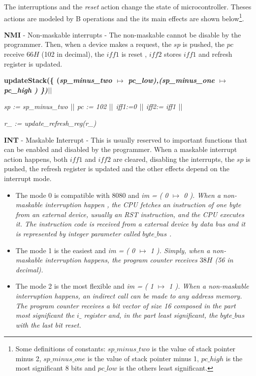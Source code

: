 \documentclass[11pt]{article} %
\begin{document}
The interruptions and the \textit{reset} action change the state of
microcontroller. Theses actions are modeled by B operations and the its main
effects are shown below\footnote{Some definitions of constants: $\mathit{sp\_minus\_two}$ is the value of stack pointer minus 2,
 $\mathit{sp\_minus\_one}$ is the value of stack pointer minus 1,
$\mathit{pc\_high}$ is the most significant 8 bits and
$\mathit{pc\_low}$ is the others least significant.}.


 \textbf{NMI} - Non-maskable interrupts - The non-maskable cannot be disable
 by the programmer. Then, when a device makes a request, the $sp$ is pushed, the $pc$ receive
 $66H$ (102 in decimal), the $\mathit{iff1}$ is reset , $\mathit{iff2}$ stores
 $\mathit{iff1}$ and refresh register is updated.
  
\begin{sloppypar}
\bf updateStack\rm (\rm \{ \rm (\it sp\_minus\_two  $\mapsto$  \it pc\_low\rm )\rm ,\rm (\it sp\_minus\_one  $\mapsto$ \it pc\_high \rm ) \rm \}\rm )$\mbox{$\mid\mid$}$

\it sp \rm := \it sp\_minus\_two  $\mbox{$\mid\mid$}$ \it pc \rm := \rm 1\rm 0\rm 2 $\mbox{$\mid\mid$}$ \it iff1\rm :=\rm 0  $\mbox{$\mid\mid$}$  \it iff2\rm := \it iff1 $\mbox{$\mid\mid$}$

\it r\_ \rm := \it update\_refresh\_reg\rm (\it r\_\rm )\\
\end{sloppypar}

  \textbf{INT} - Maskable Interrupt -  This is usually reserved to important functions that can be enabled and
  disabled by the programmer. When a maskable interrupt action happens, both $\mathit{iff1}$ and $\mathit{iff2}$ are
  cleared, disabling the interrupts, the $sp$ is pushed, the refresh register is updated  and the other effects
  depend on the interrupt mode.
 

 \begin{itemize}
   
  \item The mode 0 is compatible with 8080 and  \it im \rm = \rm ( \rm 0 $\mapsto$  \rm 0 \rm ). When a 
  non-maskable interruption happen , the CPU fetches an instruction of one byte from an external device, usually an
  RST instruction, and the CPU executes it. The instruction code is received from a external device by data bus and
  it is represented by integer parameter called $\mathit{byte\_bus}$ .

 
  \item The mode 1 is the easiest and \it im \rm = \rm ( \rm 0  $\mapsto$  \rm 1 \rm ). Simply, when a non-maskable
  interruption happens, the program counter receives $38H$ (56 in decimal).
  
  \item The mode 2 is the most flexible and  \it im \rm = \rm ( \rm 1  $\mapsto$ \rm 1 \rm ). When a non-maskable
  interruption happens, an indirect call can be made to any address memory. The program counter receives a bit vector of size 16 composed in the
  part most significant the $\mathit{i\_}$ register and, in the  part least significant, the $\mathit{byte\_bus}$
  with the last bit reset.
 \end{itemize}
\end{document}
